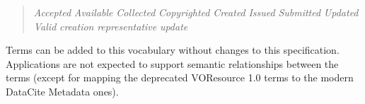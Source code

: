\documentclass[11pt,a4paper]{ivoa}
\begin{document}
\begin{quotation}\noindent
\textsl{Accepted}
\textsl{Available}
\textsl{Collected}
\textsl{Copyrighted}
\textsl{Created}
\textsl{Issued}
\textsl{Submitted}
\textsl{Updated}
\textsl{Valid}
\textsl{creation}
\textsl{representative}
\textsl{update}

\end{quotation}


Terms can be added to this vocabulary without changes to this
specification.  Applications are not expected to support semantic
relationships between the terms (except for mapping the deprecated
VOResource 1.0 terms to the modern DataCite Metadata ones).

\end{document}
